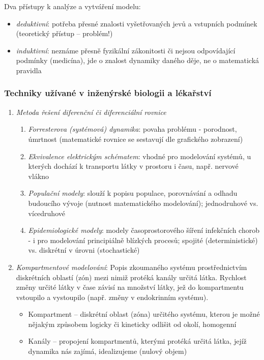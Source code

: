 Dva přístupy k analýze a vytváření modelu:
\begin{itemize}
\item \textit{deduktivní}: potřeba přesné znalosti vyšetřovaných jevů a vstupních podmínek (teoretický přístup – problém!)
\item \textit{induktivní}: neznáme přesně fyzikální zákonitosti či nejsou odpovídající podmínky (medicína), jde o znalost dynamiky daného děje, ne o matematická pravidla
\end{itemize}

\subsubsection*{Techniky užívané v inženýrské biologii a lékařství}
\begin{enumerate}[label=(\alph*)]
\item \textit{Metoda řešení diferenční či diferenciální rovnice}
\begin{enumerate}[label=(\roman*)]
\item \textit{Forresterova (systémová) dynamika}: povaha problému - porodnost, úmrtnost (matematické rovnice se sestavují dle grafického zobrazení)
\item \textit{Ekvivalence elektrickým schématem}: vhodné pro modelování systémů, u kterých dochází k transportu látky v prostoru i času, např. nervové vlákno
\item \textit{Populační modely}: slouží k popisu populace, porovnávání a odhadu budoucího vývoje (nutnost matematického modelování); jednodruhové vs. vícedruhové
\item \textit{Epidemiologické modely}: modely časoprostorového šíření infekčních chorob - i pro modelování principiálně blízkých procesů; spojité (deterministické) vs. diskrétní v úrovni (stochastické)
\end{enumerate}
\item \textit{Kompartmentové modelování}: Popis zkoumaného systému prostřednictvím diskrétních oblastí (zón) mezi nimiž protéká kanály určitá látka. Rychlost změny určité látky v čase závisí na množství látky, jež do kompartmentu vstoupilo a vystoupilo (např. změny v endokrinním systému).
\begin{itemize}
\item Kompartment – diskrétní oblast (zóna) určitého systému, kterou je možné nějakým způsobem logicky či kineticky odlišit od okolí, homogenní
\item Kanály – propojení kompartmentů, kterými protéká určitá látka, jejíž dynamika nás zajímá, idealizujeme (nulový objem)

\end{itemize}
\end{enumerate}
